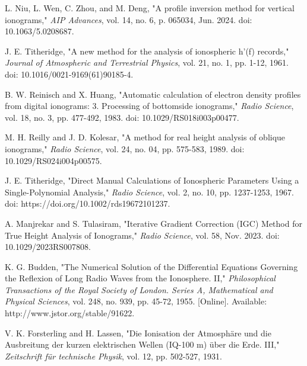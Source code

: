 \documentclass[aps,twocolumn,prb,showpacs,superscriptaddress]{revtex4-2}
\newcommand{\+}{\dagger}
\begin{document}
\begin{thebibliography}{99}

     L. Niu, L. Wen, C. Zhou, and M. Deng, "A profile inversion method for vertical ionograms," \textit{AIP Advances}, vol. 14, no. 6, p. 065034, Jun. 2024. doi: 10.1063/5.0208687.
    
     J. E. Titheridge, "A new method for the analysis of ionospheric h'(f) records," \textit{Journal of Atmospheric and Terrestrial Physics}, vol. 21, no. 1, pp. 1-12, 1961. doi: 10.1016/0021-9169(61)90185-4.
    
     B. W. Reinisch and X. Huang, "Automatic calculation of electron density profiles from digital ionograms: 3. Processing of bottomside ionograms," \textit{Radio Science}, vol. 18, no. 3, pp. 477-492, 1983. doi: 10.1029/RS018i003p00477.
    
     M. H. Reilly and J. D. Kolesar, "A method for real height analysis of oblique ionograms," \textit{Radio Science}, vol. 24, no. 04, pp. 575-583, 1989. doi: 10.1029/RS024i004p00575.
    
     J. E. Titheridge, "Direct Manual Calculations of Ionospheric Parameters Using a Single-Polynomial Analysis," \textit{Radio Science}, vol. 2, no. 10, pp. 1237-1253, 1967. doi: https://doi.org/10.1002/rds19672101237.
    
     A. Manjrekar and S. Tulasiram, "Iterative Gradient Correction (IGC) Method for True Height Analysis of Ionograms," \textit{Radio Science}, vol. 58, Nov. 2023. doi: 10.1029/2023RS007808.
    
     K. G. Budden, "The Numerical Solution of the Differential Equations Governing the Reflexion of Long Radio Waves from the Ionosphere. II," \textit{Philosophical Transactions of the Royal Society of London. Series A, Mathematical and Physical Sciences}, vol. 248, no. 939, pp. 45-72, 1955. [Online]. Available: http://www.jstor.org/stable/91622.
    
     V. K. Forsterling and H. Lassen, "Die Ionisation der Atmosphäre und die Ausbreitung der kurzen elektrischen Wellen (IQ-100 m) über die Erde. III," \textit{Zeitschrift für technische Physik}, vol. 12, pp. 502-527, 1931.
    
\end{thebibliography}
    
\end{document}

